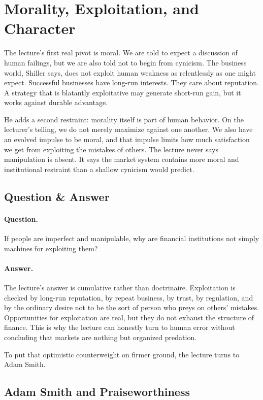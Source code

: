 \section{Morality, Exploitation, and Character}

The lecture's first real pivot is moral. We are told to expect a discussion of human failings, but we are also told not to begin from cynicism. The business world, Shiller says, does not exploit human weakness as relentlessly as one might expect. Successful businesses have long-run interests. They care about reputation. A strategy that is blatantly exploitative may generate short-run gain, but it works against durable advantage.

He adds a second restraint: morality itself is part of human behavior. On the lecturer's telling, we do not merely maximize against one another. We also have an evolved impulse to be moral, and that impulse limits how much satisfaction we get from exploiting the mistakes of others. The lecture never says manipulation is absent. It says the market system contains more moral and institutional restraint than a shallow cynicism would predict.

\subsection{Question \& Answer}

\paragraph{Question.} If people are imperfect and manipulable, why are financial institutions not simply machines for exploiting them?

\paragraph{Answer.} The lecture's answer is cumulative rather than doctrinaire. Exploitation is checked by long-run reputation, by repeat business, by trust, by regulation, and by the ordinary desire not to be the sort of person who preys on others' mistakes. Opportunities for exploitation are real, but they do not exhaust the structure of finance. This is why the lecture can honestly turn to human error without concluding that markets are nothing but organized predation.

To put that optimistic counterweight on firmer ground, the lecture turns to Adam Smith.

\subsection{Adam Smith and Praiseworthiness}

